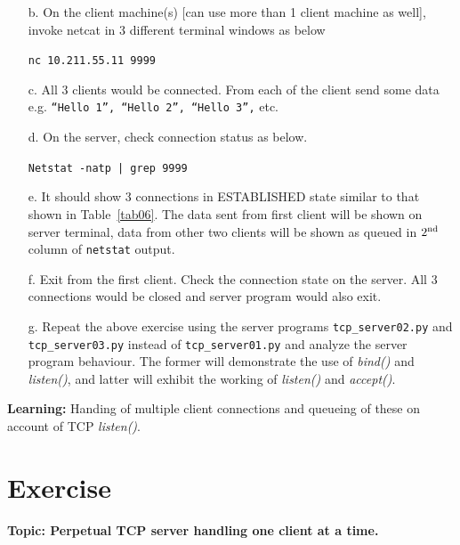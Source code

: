 \begin{multicols}{2}
\begin{itemize}
\item[b.] On the client machine(s) [can use more than 1 client machine as well], invoke netcat in 3 different terminal windows as below

\texttt{nc 10.211.55.11 9999}

\item[c.] All 3 clients would be connected. From each of the client send some data e.g. \texttt{“Hello 1”, “Hello 2”, “Hello 3”,} etc.

\item[d.] On the server, check connection status as below.

\texttt{Netstat -natp | grep 9999}

\item[e.] It should show 3 connections in ESTABLISHED state similar to that shown in Table~\ref{tab06}. The data sent from first client will be shown on server terminal, data from other two clients will be shown as queued in $2^{\rm nd}$ column of \texttt{netstat} output.

\item[f.] Exit from the first client. Check the connection state on the server. All 3 connections would be closed and server program would also exit.

\item[g.] Repeat the above exercise using the server programs \texttt{tcp\_server02.py} and \texttt{tcp\_server03.py} instead of \texttt{tcp\_server01.py} and analyze the server program behaviour. The former will demonstrate the use of \textit{bind()} and \textit{listen()}, and latter will exhibit the working of \textit{listen()} and \textit{accept()}.
\end{itemize}

\vspace{-.3cm}

\textbf{Learning:} Handing of multiple client connections and queueing of these on account of TCP \textit{listen()}.

\vspace{-.3cm}

\section*{Exercise \label{chap1-exe02}}

\textbf{Topic: Perpetual TCP server handling one client at a time.}

\begin{itemize}


\end{itemize}
\end{multicols}
